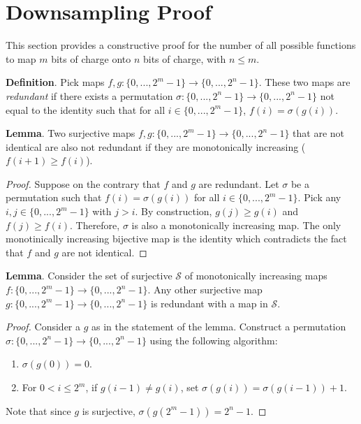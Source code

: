 \documentclass[12pt]{article}
\begin{document}
\section{\label{sec:app} Downsampling Proof}


This section provides a constructive proof for the number of all possible functions to map $m$ bits of charge onto $n$ bits of charge, with $n\leq m$.  

\vspace{4mm}

\noindent \textbf{Definition}. Pick maps $f,g:\{0,...,2^{m}-1\}\rightarrow\{0,...,2^{n}-1\}$.  These two maps are \textit{redundant} if there exists a permutation $\sigma:\{0,...,2^{n}-1\}\rightarrow\{0,...,2^{n}-1\}$ not equal to the identity such that for all $i\in\{0,...,2^{m}-1\}$, $f(i)=\sigma(g(i))$.  

\vspace{4mm}

\noindent \textbf{Lemma}. Two surjective maps $f,g:\{0,...,2^{m}-1\}\rightarrow\{0,...,2^{n}-1\}$ that are not identical are also not redundant if they are monotonically increasing ($f(i+1)\geq f(i)$).

\vspace{4mm}

\begin{proof}
Suppose on the contrary that $f$ and $g$ are redundant.  Let $\sigma$ be a permutation such that $f(i)=\sigma(g(i))$ for all $i\in \{0,...,2^{m}-1\}$.  Pick any $i,j\in \{0,...,2^{m}-1\}$ with $j > i$.  By construction, $g(j)\geq g(i)$ and $f(j) \geq f(i)$.  Therefore, $\sigma$ is also a monotonically increasing map.  The only monotinically increasing bijective map is the identity which contradicts the fact that $f$ and $g$ are not identical. 
\end{proof}

\vspace{4mm}

\noindent \textbf{Lemma}. Consider the set of surjective $\mathcal{S}$ of monotonically increasing maps $f:\{0,...,2^{m}-1\}\rightarrow\{0,...,2^{n}-1\}$.  Any other surjective map $g:\{0,...,2^{m}-1\}\rightarrow\{0,...,2^{n}-1\}$ is redundant with a map in $\mathcal{S}$.

\vspace{4mm}

\begin{proof}
Consider a $g$ as in the statement of the lemma.  Construct a permutation $\sigma:\{0,...,2^{n}-1\}\rightarrow\{0,...,2^{n}-1\}$ using the following algorithm:

\begin{enumerate}
\item $\sigma(g(0))=0$.
\item For $0<i\leq2^{m}$, if $g(i-1)\neq g(i)$, set $\sigma(g(i))=\sigma(g(i-1))+1$.
\end{enumerate}

\noindent Note that since $g$ is surjective, $\sigma(g(2^{m}-1))=2^n-1$.

\end{proof}
\end{document}
